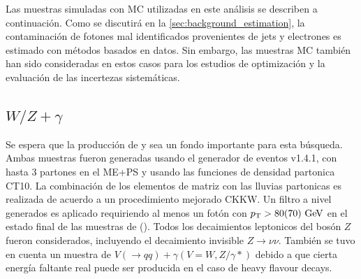 \newcommand{\mccaption}{La sección eficaz a LO para cada modo de decaimiento,
  los factores $k$ (para la normalización NLO) y las eficiencias del filtro
  están detalladas, así como también la luminosidad integrada correspondiente
  a la estadística total de cada muestra.}

Las muestras simuladas con MC utilizadas en este análisis se describen
a continuación. Como se discutirá en la \cref{sec:background_estimation},
la contaminación de fotones mal identificados provenientes de jets y electrones
es estimado con métodos basados en datos. Sin embargo, las muestras MC también
han sido consideradas en estos casos para los estudios de optimización y la
evaluación de las incertezas sistemáticas.

\subsection{$W/Z + \gamma$}

Se espera que la producción de {\wgam} y {\zgam} sea un fondo importante
para esta búsqueda. Ambas muestras fueron generadas usando el generador
de eventos {\sherpa} v1.4.1\cite{SherpaGen}, con hasta 3 partones en el
ME+PS y usando las funciones de densidad partonica CT10.
La combinación de los elementos de matriz con las lluvias partonicas
es realizada de acuerdo a un procedimiento mejorado CKKW\cite{Catani:2001cc,Krauss:2002up}.
Un filtro a nivel generados es aplicado requiriendo al menos un fotón
con $\pt > 80(70) \gev$ en el estado final de las muestras de {\wgam} (\zgam).
Todos los decaimientos leptonicos del bosón $Z$ fueron considerados,
incluyendo el decaimiento invisible $Z\to\nu\nu$.
También se tuvo en cuenta un muestra de $V(\to qq)+\gamma  (V=W,Z/\gamma*)$
debido a que cierta energía faltante real puede  ser producida en el caso
de heavy flavour decays.


